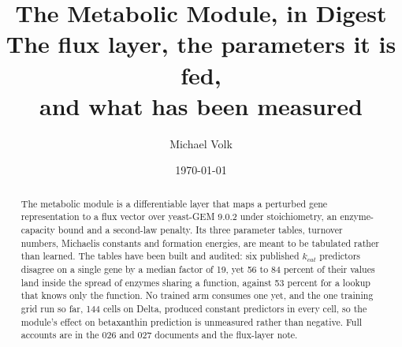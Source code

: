 \documentclass[10pt,a4paper]{article}
\title{\vspace{-1.5em}The Metabolic Module, in Digest\\
  {\large The flux layer, the parameters it is fed,\\and what has been measured}}
\author{Michael Volk}
\date{\today}
\begin{document}
\maketitle
\thispagestyle{empty}

\begin{abstract}
\noindent
The metabolic module is a differentiable layer that maps a perturbed gene representation to
a flux vector over yeast-GEM 9.0.2 under stoichiometry, an enzyme-capacity bound and a
second-law penalty. Its three parameter tables,
turnover numbers, Michaelis constants and formation energies, are meant to be tabulated
rather than learned. The tables have been built and audited: six published $k_{cat}$
predictors disagree on a single gene by a median factor of 19, yet 56 to 84 percent of
their values land inside the spread of enzymes sharing a function, against 53 percent for a
lookup that knows only the function. No trained arm consumes one yet, and the one training
grid run so far, 144 cells on Delta, produced constant predictors in every cell, so the
module's effect on betaxanthin prediction is unmeasured rather than negative. Full accounts
are in the 026 and 027 documents and the flux-layer note.
\end{abstract}




\end{document}
